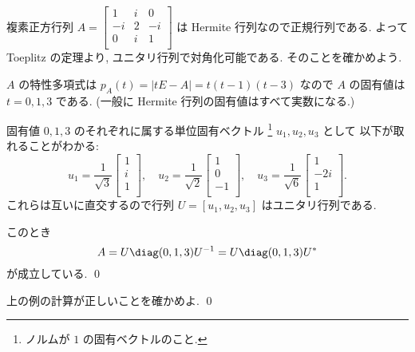 \documentclass[12pt,twoside]{jarticle}
\begin{document}
\begin{example}
  複素正方行列 $
    A=
    \begin{bmatrix}
       1 & i &  0 \\
      -i & 2 & -i \\
       0 & i &  1 \\
    \end{bmatrix}
  $ は Hermite 行列なので正規行列である. 
  よって Toeplitz の定理より, ユニタリ行列で対角化可能である.
  そのことを確かめよう.

  $A$ の特性多項式は $p_A(t) = |tE - A| = t(t-1)(t-3)$ なので %
  $A$ の固有値は $t=0,1,3$ である.
  (一般に Hermite 行列の固有値はすべて実数になる.)

  固有値 $0,1,3$ のそれぞれに属する単位固有ベクトル%
  \footnote{ノルムが $1$ の固有ベクトルのこと.} %
  $u_1,u_2,u_3$ として
  以下が取れることがわかる:
  \begin{equation*}
    u_1 = 
    \frac{1}{\sqrt{3}}
    \begin{bmatrix}
      1 \\ i \\ 1 \\
    \end{bmatrix},
    \quad
    u_2 =
    \frac{1}{\sqrt{2}}
    \begin{bmatrix}
      1 \\ 0 \\ -1 \\
    \end{bmatrix},
    \quad
    u_3 =
    \frac{1}{\sqrt{6}}
    \begin{bmatrix}
      1 \\ -2i \\ 1 \\
    \end{bmatrix}.
  \end{equation*}
  これらは互いに直交するので行列 $U=[u_1,u_2,u_3]$ はユニタリ行列である.

  このとき
  \begin{equation*}
    A = U \diag(0,1,3) U^{-1} = U \diag(0,1,3) U^*
  \end{equation*}
  が成立している. \qed
\end{example}

\begin{question}[5点]
  上の例の計算が正しいことを確かめよ. \qed
\end{question}
\end{document}
